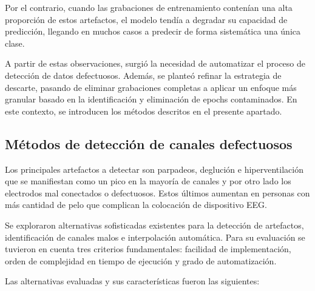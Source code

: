 Por el contrario, cuando las grabaciones de entrenamiento contenían una alta proporción de estos artefactos, el modelo tendía a degradar su capacidad de predicción, llegando en muchos casos a predecir de forma sistemática una única clase.

A partir de estas observaciones, surgió la necesidad de automatizar el proceso de detección de datos defectuosos. Además, se planteó refinar la estrategia de descarte, pasando de eliminar grabaciones completas a aplicar un enfoque más granular basado en la identificación y eliminación de epochs contaminados. En este contexto, se introducen los métodos descritos en el presente apartado.

\subsection{Métodos de detección de canales defectuosos}
\label{subsec:metodos_deteccion_canales}

Los principales artefactos a detectar son parpadeos, deglución e hiperventilación que se manifiestan como un pico en la mayoría de canales y por otro lado los electrodos mal conectados o defectuosos. Estos últimos aumentan en personas con más cantidad de pelo que complican la colocación de dispositivo EEG. 

Se exploraron alternativas sofisticadas existentes para la detección de artefactos, identificación de canales malos e interpolación automática. Para su evaluación se tuvieron en cuenta tres criterios fundamentales: facilidad de implementación, orden de complejidad en tiempo de ejecución y grado de automatización.

Las alternativas evaluadas y sus características fueron las siguientes:

